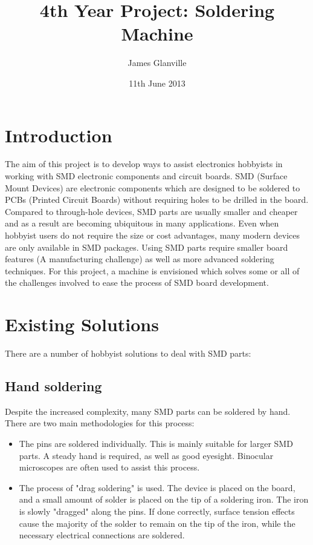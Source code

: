 \documentclass[a4paper,11pt]{article}  %
\title{4th Year Project: Soldering Machine}
\author{James Glanville}
\date{11th June 2013}
\begin{document}
\maketitle

\tableofcontents

\section{Introduction}
The aim of this project is to develop ways to assist electronics hobbyists in working with SMD electronic components
and circuit boards. SMD (Surface Mount Devices) are electronic components which are designed to be soldered to PCBs
(Printed Circuit Boards) without requiring holes to be drilled in the board. Compared to through-hole devices, SMD parts 
are usually smaller and cheaper and as a result are becoming ubiquitous in many applications. Even when hobbyist users do
not require the size or cost advantages, many modern devices are only available in SMD packages. Using SMD parts require
smaller board features (A manufacturing challenge) as well as more advanced soldering techniques. For this project, a machine
is envisioned which solves some or all of the challenges involved to ease the process of SMD board development.

\section{Existing Solutions}
There are a number of hobbyist solutions to deal with SMD parts:

\subsection{Hand soldering}
Despite the increased complexity, many SMD parts can be soldered by hand. There are two main methodologies for this process:

\begin{itemize}
	\item	The pins are soldered individually. This is mainly suitable for larger SMD parts. A steady hand is required, as well as good eyesight.
			Binocular microscopes are often used to assist this process.
			
	\item	The process of "drag soldering" is used. The device is placed on the board, and a small amount of solder is placed on the tip of a soldering iron.
			The iron is slowly "dragged" along the pins. If done correctly, surface tension effects cause the majority of the solder to remain on the tip of the iron,
			while the necessary electrical connections are soldered.
\end{itemize}
\end{document}
